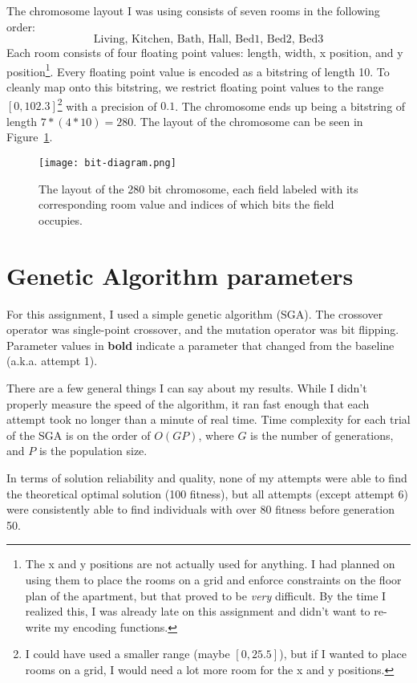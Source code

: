 \documentclass[12pt, letterpaper]{article}
\begin{document}
The chromosome layout I was using consists of seven rooms in the following order:
\[\text{Living, Kitchen, Bath, Hall, Bed1, Bed2, Bed3}\]
Each room consists of four floating point values: length, width, x position, and y position\footnote{
    The x and y positions are not actually used for anything.
    I had planned on using them to place the rooms on a grid and enforce constraints on the floor plan of the apartment,
    but that proved to be \textit{very} difficult.
    By the time I realized this, I was already late on this assignment
    and didn't want to re-write my encoding functions.
}.
Every floating point value is encoded as a bitstring of length 10.
To cleanly map onto this bitstring, we restrict floating point values to the range $[0, 102.3]$\footnote{
    I could have used a smaller range (maybe $[0, 25.5]$),
    but if I wanted to place rooms on a grid, I would need a lot more room for the x and y positions.
} with a precision of $0.1$.
The chromosome ends up being a bitstring of length $7 * (4 * 10) = 280$.
The layout of the chromosome can be seen in Figure~\ref{Fig:Bits}.

\begin{figure}[H]
    \centerline{\texttt{[image: bit-diagram.png]}}
    \caption{The layout of the 280 bit chromosome, each field labeled with its corresponding room value and indices of which bits the field occupies.}\label{Fig:Bits}
\end{figure}

\pagebreak
\section{Genetic Algorithm parameters}

For this assignment, I used a simple genetic algorithm (SGA).
The crossover operator was single-point crossover, and the mutation operator was bit flipping.
Parameter values in \textbf{bold} indicate a parameter that changed from the baseline (a.k.a. attempt 1).

There are a few general things I can say about my results.
While I didn't properly measure the speed of the algorithm,
it ran fast enough that each attempt took no longer than a minute of real time.
Time complexity for each trial of the SGA is on the order of $O(GP)$,
where $G$ is the number of generations, and $P$ is the population size.

In terms of solution reliability and quality,
none of my attempts were able to find the theoretical optimal solution (100 fitness),
but all attempts (except attempt 6) were consistently able to find individuals with over 80 fitness before generation 50.
\end{document}
